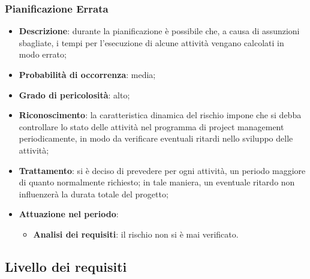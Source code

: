 		\subsubsection{Pianificazione Errata}
		\begin{itemize}
			\item \textbf{Descrizione}: durante la pianificazione è possibile che, a causa di assunzioni sbagliate, i tempi per l'esecuzione di alcune attività vengano calcolati in modo errato;
			\item \textbf{Probabilità di occorrenza}: media;
			\item \textbf{Grado di pericolosità}: alto;
			\item \textbf{Riconoscimento}: la caratteristica dinamica del rischio impone che si debba controllare lo stato delle attività nel programma di project management periodicamente, in modo da verificare eventuali ritardi nello sviluppo delle attività; 
			\item \textbf{Trattamento}: si è deciso di prevedere per ogni attività, un periodo maggiore di quanto normalmente richiesto; in tale maniera, un eventuale ritardo non influenzerà la durata totale del progetto; 
			\item \textbf{Attuazione nel periodo}:
			\begin{itemize}
				\item \textbf{Analisi dei requisiti}:  il rischio non si è mai verificato.
			\end{itemize}
		\end{itemize}
	\subsection{Livello dei requisiti}
